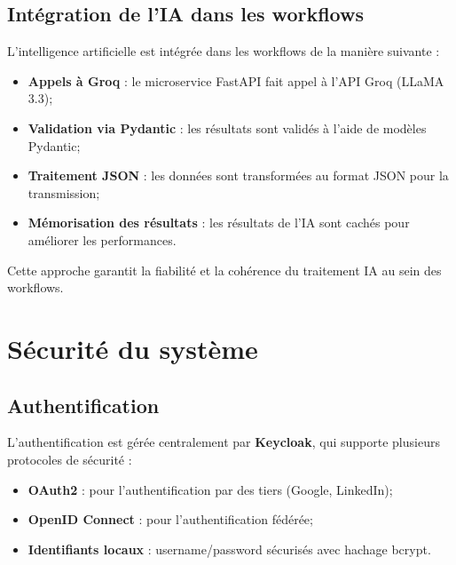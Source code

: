 \subsection{Intégration de l'IA dans les workflows}
\label{subsec:integration-ia-workflows}

L'intelligence artificielle est intégrée dans les workflows de la manière suivante :

\begin{itemize}
    \item \textbf{Appels à Groq} : le microservice FastAPI fait appel à l'API Groq (LLaMA 3.3);
    
    \item \textbf{Validation via Pydantic} : les résultats sont validés à l'aide de modèles Pydantic;
    
    \item \textbf{Traitement JSON} : les données sont transformées au format JSON pour la transmission;
    
    \item \textbf{Mémorisation des résultats} : les résultats de l'IA sont cachés pour améliorer les performances.
\end{itemize}

Cette approche garantit la fiabilité et la cohérence du traitement IA au sein des workflows.


\section{Sécurité du système}
\label{sec:securite-systeme}

\subsection{Authentification}
\label{subsec:authentification}

L'authentification est gérée centralement par \textbf{Keycloak}, qui supporte plusieurs protocoles de sécurité :

\begin{itemize}
    \item \textbf{OAuth2} : pour l'authentification par des tiers (Google, LinkedIn);
    
    \item \textbf{OpenID Connect} : pour l'authentification fédérée;
    
    \item \textbf{Identifiants locaux} : username/password sécurisés avec hachage bcrypt.
\end{itemize}

